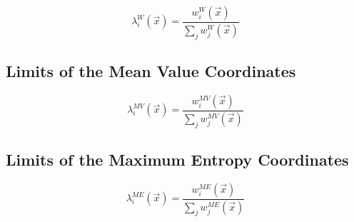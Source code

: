 \begin{equation}
\label{eq::App_BF_WachBF}
\lambda_i^{W} (\vec{x}) = \frac{w_i^W  (\vec{x}) }{\sum_j w_j^W  (\vec{x}) }
\end{equation}

\subsection{Limits of the Mean Value Coordinates}
\label{sec::appendix_BF_Limits_MV}

\begin{equation}
\label{eq::App_BF_MVBF}
\lambda_i^{MV} (\vec{x}) = \frac{w_i^{MV}  (\vec{x}) }{\sum_j w_j^{MV}  (\vec{x}) }
\end{equation}

\subsection{Limits of the Maximum Entropy Coordinates}
\label{sec::appendix_BF_Limits_ME}


\begin{equation}
\label{eq::App_BF_MEBF}
\lambda_i^{ME} (\vec{x}) = \frac{w_i^{ME}  (\vec{x}) }{\sum_j w_j^{ME}  (\vec{x}) }
\end{equation}